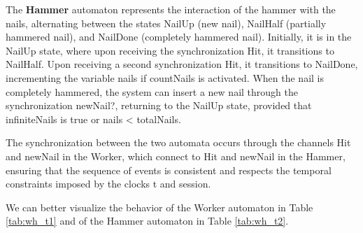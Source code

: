 The \textbf{Hammer} automaton represents the interaction of the hammer with the nails, alternating between the states NailUp (new nail), NailHalf (partially hammered nail), and NailDone (completely hammered nail). Initially, it is in the NailUp state, where upon receiving the synchronization Hit, it transitions to NailHalf. Upon receiving a second synchronization Hit, it transitions to NailDone, incrementing the variable nails if countNails is activated. When the nail is completely hammered, the system can insert a new nail through the synchronization newNail?, returning to the NailUp state, provided that infiniteNails is true or nails < totalNails. 

The synchronization between the two automata occurs through the channels Hit and newNail in the Worker, which connect to Hit and newNail in the Hammer, ensuring that the sequence of events is consistent and respects the temporal constraints imposed by the clocks t and session.

We can better visualize the behavior of the Worker automaton in Table \ref{tab:wh_t1} and of the Hammer automaton in Table \ref{tab:wh_t2}.
\paragraph{}

\begin{table}[h!]
\centering
{}
\caption[Worker Transistion Table]{Worker Transistion Table}
\label{tab:wh_t1}
\end{table}
 
